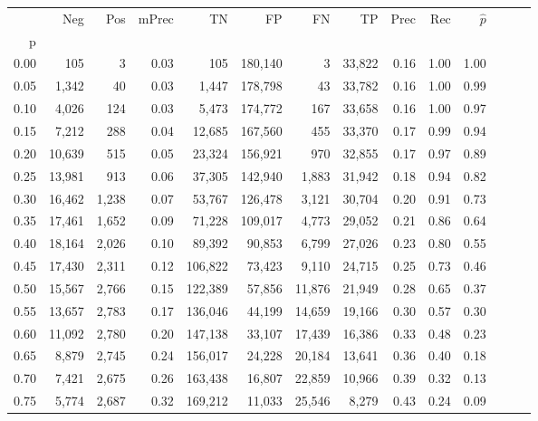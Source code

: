 \begin{tabular}{rrrrrrrrrrrrrr}
\toprule
{} &     Neg &    Pos & mPrec &       TN &       FP &      FN &      TP &  Prec &   Rec & $\hat{p}$ \\
p    &         &        &       &          &          &         &         &       &       &           \\
\midrule
0.00 &     105 &      3 &  0.03 &      105 &  180,140 &       3 &  33,822 &  0.16 &  1.00 &      1.00 \\
0.05 &   1,342 &     40 &  0.03 &    1,447 &  178,798 &      43 &  33,782 &  0.16 &  1.00 &      0.99 \\
0.10 &   4,026 &    124 &  0.03 &    5,473 &  174,772 &     167 &  33,658 &  0.16 &  1.00 &      0.97 \\
0.15 &   7,212 &    288 &  0.04 &   12,685 &  167,560 &     455 &  33,370 &  0.17 &  0.99 &      0.94 \\
0.20 &  10,639 &    515 &  0.05 &   23,324 &  156,921 &     970 &  32,855 &  0.17 &  0.97 &      0.89 \\
0.25 &  13,981 &    913 &  0.06 &   37,305 &  142,940 &   1,883 &  31,942 &  0.18 &  0.94 &      0.82 \\
0.30 &  16,462 &  1,238 &  0.07 &   53,767 &  126,478 &   3,121 &  30,704 &  0.20 &  0.91 &      0.73 \\
0.35 &  17,461 &  1,652 &  0.09 &   71,228 &  109,017 &   4,773 &  29,052 &  0.21 &  0.86 &      0.64 \\
0.40 &  18,164 &  2,026 &  0.10 &   89,392 &   90,853 &   6,799 &  27,026 &  0.23 &  0.80 &      0.55 \\
0.45 &  17,430 &  2,311 &  0.12 &  106,822 &   73,423 &   9,110 &  24,715 &  0.25 &  0.73 &      0.46 \\
0.50 &  15,567 &  2,766 &  0.15 &  122,389 &   57,856 &  11,876 &  21,949 &  0.28 &  0.65 &      0.37 \\
0.55 &  13,657 &  2,783 &  0.17 &  136,046 &   44,199 &  14,659 &  19,166 &  0.30 &  0.57 &      0.30 \\
0.60 &  11,092 &  2,780 &  0.20 &  147,138 &   33,107 &  17,439 &  16,386 &  0.33 &  0.48 &      0.23 \\
0.65 &   8,879 &  2,745 &  0.24 &  156,017 &   24,228 &  20,184 &  13,641 &  0.36 &  0.40 &      0.18 \\
0.70 &   7,421 &  2,675 &  0.26 &  163,438 &   16,807 &  22,859 &  10,966 &  0.39 &  0.32 &      0.13 \\
0.75 &   5,774 &  2,687 &  0.32 &  169,212 &   11,033 &  25,546 &   8,279 &  0.43 &  0.24 &      0.09 \\

\end{tabular}
